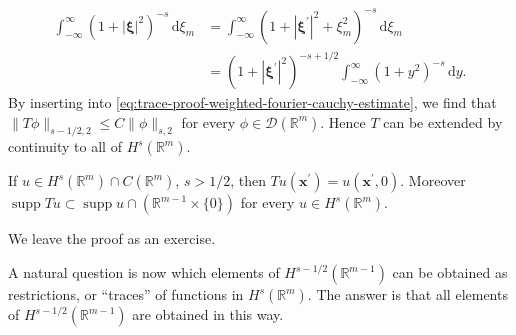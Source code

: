 \begin{Proof}
\begin{equation}
\begin{aligned}
\int_{-\infty}^{\infty}(1+|\bm{\xi}|^2)^{-s}\,\mathrm{d}\xi_m
&=\int_{-\infty}^{\infty}(1+|\bm{\xi}^{\prime}|^2+\xi_m^2)^{-s}\,\mathrm{d}\xi_m\\
&=(1+|\bm{\xi}^{\prime}|^2)^{-s+1/2}\int_{-\infty}^{\infty}(1+y^2)^{-s}\,\mathrm{d}y.
\end{aligned}
\end{equation}
By inserting into \eqref{eq:trace-proof-weighted-fourier-cauchy-estimate}, we find that $\|T\phi\|_{s-1/2,2}\leq C\|\phi\|_{s,2}$ for every $\phi\in\mathcal{D}(\mathbb{R}^m)$. Hence $T$ can be extended by continuity to all of $H^s(\mathbb{R}^m)$.
\end{Proof}
\endgroup

\begin{Lemma}
\label{lem:continuous-function-trace-and-support}
If $u\in H^s(\mathbb{R}^m)\cap C(\mathbb{R}^m)$, $s>1/2$, then $Tu(\bm{x}^{\prime})=u(\bm{x}^{\prime},0)$. Moreover $\operatorname{supp}Tu\subset\operatorname{supp}u\cap(\mathbb{R}^{m-1}\times\{0\})$ for every $u\in H^s(\mathbb{R}^m)$.
\end{Lemma}

We leave the proof as an exercise.

A natural question is now which elements of $H^{s-1/2}(\mathbb{R}^{m-1})$ can be obtained as restrictions, or ``traces'' of functions in $H^s(\mathbb{R}^m)$. The answer is that all elements of $H^{s-1/2}(\mathbb{R}^{m-1})$ are obtained in this way.
